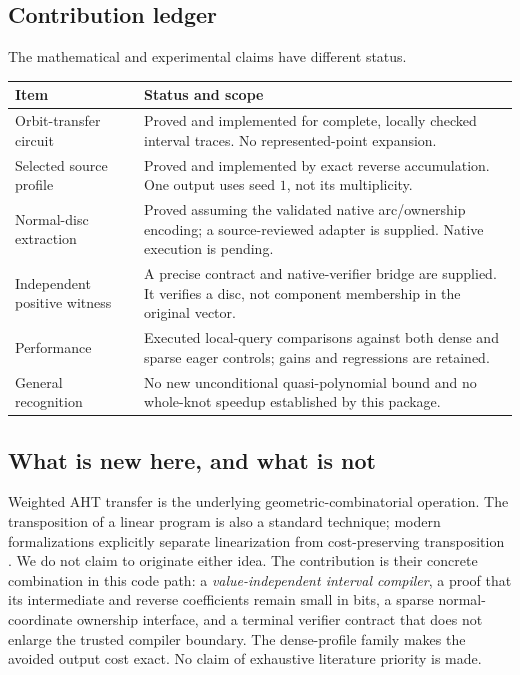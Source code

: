 \documentclass[11pt]{article}
\theoremstyle{definition}\newtheorem{definition}[theorem]{Definition}
\theoremstyle{remark}\newtheorem{remark}[theorem]{Remark}
\begin{document}
\subsection{Contribution ledger}
The mathematical and experimental claims have different status.
\begin{center}
\begin{tabular}{p{}p{}}
\toprule
Item & Status and scope\\
\midrule
Orbit-transfer circuit & Proved and implemented for complete, locally checked
interval traces. No represented-point expansion.\\[0.3em]
Selected source profile & Proved and implemented by exact reverse accumulation.
One output uses seed $1$, not its multiplicity.\\[0.3em]
Normal-disc extraction & Proved assuming the validated native arc/ownership
encoding; a source-reviewed adapter is supplied. Native execution is pending.\\[0.3em]
Independent positive witness & A precise contract and native-verifier bridge are
supplied. It verifies a disc, not component membership in the original vector.\\[0.3em]
Performance & Executed local-query comparisons against both dense and sparse
eager controls; gains and regressions are retained.\\[0.3em]
General recognition & No new unconditional quasi-polynomial bound and no
whole-knot speedup established by this package.\\
\bottomrule
\end{tabular}
\end{center}

\subsection{What is new here, and what is not}
Weighted AHT transfer is the underlying geometric-combinatorial operation. The
transposition of a linear program is also a standard technique; modern
formalizations explicitly separate linearization from cost-preserving
transposition \cite{radul}. We do not claim to originate either idea. The
contribution is their concrete combination in this code path: a
\emph{value-independent interval compiler}, a proof that its intermediate and
reverse coefficients remain small in bits, a sparse normal-coordinate ownership
interface, and a terminal verifier contract that does not enlarge the trusted
compiler boundary. The dense-profile family makes the avoided output cost exact.
No claim of exhaustive literature priority is made.
\end{document}
